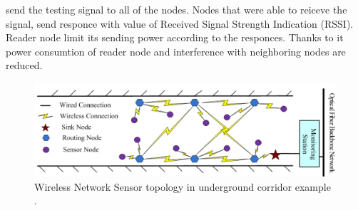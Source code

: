 \documentclass[../main.tex]{subfiles}
\begin{document}
send the testing signal to all of the nodes. Nodes that were able to reiceve the signal, send responce with value of Received Signal Strength Indication (RSSI). Reader node limit its sending power according to the responces. Thanks to it power consumtion of reader node and interference with neighboring nodes are reduced.

\begin{figure}[ht]
\includegraphics[width=\textwidth]{pictures/wsn_topology.png}
\centering
\caption{Wireless Network Sensor topology in underground corridor example \cite{WSN_monitoring}. }
\label{fig:wsn_topology}
\end{figure}
\end{document}
